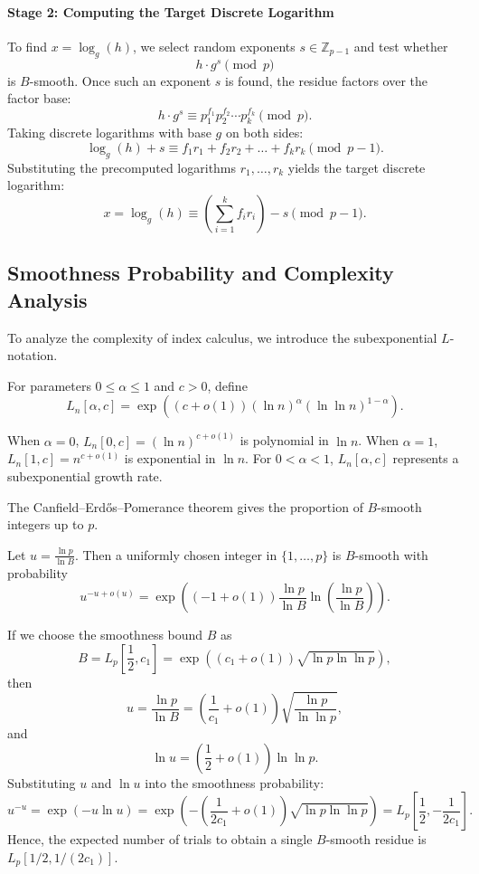 \paragraph{Stage 2: Computing the Target Discrete Logarithm}
To find \(x = \log_g(h)\), we select random exponents \(s \in \mathbb{Z}_{p-1}\) and test whether
\[
    h \cdot g^s \pmod{p}
\]
is \(B\)-smooth.
Once such an exponent \(s\) is found, the residue factors over the factor base:
\[
    h \cdot g^s \equiv p_1^{f_1} p_2^{f_2} \cdots p_k^{f_k} \pmod{p}.
\]
Taking discrete logarithms with base \(g\) on both sides:
\[
    \log_g(h) + s \equiv f_1 r_1 + f_2 r_2 + \dots + f_k r_k \pmod{p-1}.
\]
Substituting the precomputed logarithms \(r_1, \dots, r_k\) yields the target discrete logarithm:
\[
    x = \log_g(h) \equiv \left(\sum_{i=1}^k f_i r_i\right) - s \pmod{p-1}.
\]

\subsection*{Smoothness Probability and Complexity Analysis}

To analyze the complexity of index calculus, we introduce the subexponential \(L\)-notation.

\begin{definition}
    For parameters \(0 \leq \alpha \leq 1\) and \(c > 0\), define
    \[
        L_n[\alpha, c] = \exp\left( (c + o(1)) (\ln n)^\alpha (\ln \ln n)^{1 - \alpha} \right).
    \]
\end{definition}

When \(\alpha = 0\), \(L_n[0, c] = (\ln n)^{c + o(1)}\) is polynomial in \(\ln n\).
When \(\alpha = 1\), \(L_n[1, c] = n^{c + o(1)}\) is exponential in \(\ln n\).
For \(0 < \alpha < 1\), \(L_n[\alpha, c]\) represents a subexponential growth rate.

The Canfield--Erd\H{o}s--Pomerance theorem gives the proportion of \(B\)-smooth integers up to \(p\).

\begin{theorem}
    Let \(u = \frac{\ln p}{\ln B}\).
    Then a uniformly chosen integer in \(\{1, \dots, p\}\) is \(B\)-smooth with probability
    \[
        u^{-u + o(u)} = \exp\left( (-1 + o(1)) \frac{\ln p}{\ln B} \ln\left( \frac{\ln p}{\ln B} \right) \right).
    \]
\end{theorem}

If we choose the smoothness bound \(B\) as
\[
    B = L_p\left[\frac{1}{2}, c_1\right] = \exp\left( (c_1 + o(1)) \sqrt{\ln p \ln \ln p} \right),
\]
then
\[
    u = \frac{\ln p}{\ln B} = \left(\frac{1}{c_1} + o(1)\right) \sqrt{\frac{\ln p}{\ln \ln p}},
\]
and
\[
    \ln u = \left(\frac{1}{2} + o(1)\right) \ln \ln p.
\]
Substituting \(u\) and \(\ln u\) into the smoothness probability:
\[
    u^{-u} = \exp(-u \ln u) = \exp\left( -\left(\frac{1}{2c_1} + o(1)\right) \sqrt{\ln p \ln \ln p} \right) = L_p\left[\frac{1}{2}, -\frac{1}{2c_1}\right].
\]
Hence, the expected number of trials to obtain a single \(B\)-smooth residue is \(L_p[1/2, 1/(2c_1)]\).


